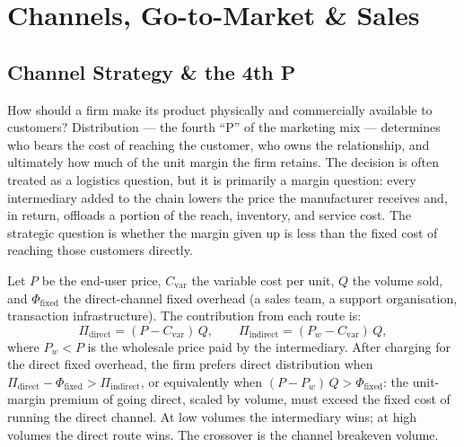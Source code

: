 \chapter{Channels, Go-to-Market \& Sales}\label{ch:channels-gtm-and-sales}


\section{Channel Strategy \& the 4th P}\label{sec:channel-strategy}

How should a firm make its product physically and commercially available to customers?
Distribution --- the fourth ``P'' of the marketing mix --- determines who bears the cost of
reaching the customer, who owns the relationship, and ultimately how much of the unit margin
the firm retains. The decision is often treated as a logistics question, but it is primarily a
margin question: every intermediary added to the chain lowers the price the manufacturer
receives and, in return, offloads a portion of the reach, inventory, and service cost. The
strategic question is whether the margin given up is less than the fixed cost of reaching
those customers directly.

Let \(P\) be the end-user price, \(C_{\text{var}}\) the variable cost per unit, \(Q\) the
volume sold, and \(\Phi_{\text{fixed}}\) the direct-channel fixed overhead (a sales team,
a support organisation, transaction infrastructure). The contribution from each route is:
\begin{equation}\label{eq:channel-margin}
  \Pi_{\text{direct}}   = (P - C_{\text{var}})\,Q, \qquad
  \Pi_{\text{indirect}} = (P_w - C_{\text{var}})\,Q,
\end{equation}
where \(P_w < P\) is the wholesale price paid by the intermediary. After charging for the
direct fixed overhead, the firm prefers direct distribution when
\(\Pi_{\text{direct}} - \Phi_{\text{fixed}} > \Pi_{\text{indirect}}\), or equivalently when
\((P - P_w)\,Q > \Phi_{\text{fixed}}\): the unit-margin premium of going direct, scaled by
volume, must exceed the fixed cost of running the direct channel. At low volumes the
intermediary wins; at high volumes the direct route wins. The crossover is the channel
breakeven volume.

